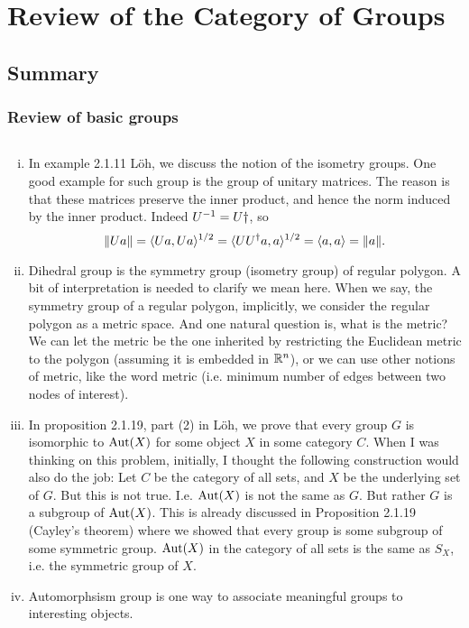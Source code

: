 \chapter{Review of the Category of Groups}


\section{Summary}
\subsection{Review of basic groups}
\begin{summary}
	$  $\\
	\begin{enumerate}[(i)]
		\item In example 2.1.11 L\"{o}h, we discuss the notion of the isometry groups. One good example for such group is the group of unitary matrices. The reason is that these matrices preserve the inner product, and hence the norm induced by the inner product. Indeed $ U^{-1} = U\dagger $, so
		\[ \norm{U a} = \langle Ua, Ua \rangle^{1/2} = \langle UU^\dagger a, a\rangle^{1/2} = \langle a,a \rangle =  \norm{a}. \]
		
		
		\item Dihedral group is the symmetry group (isometry group) of regular polygon. A bit of interpretation is needed to clarify we mean here. When we say, the symmetry group of a regular polygon, implicitly, we consider the regular polygon as a metric space. And one natural question is, what is the metric? We can let the metric be the one inherited by restricting the Euclidean metric to the polygon (assuming it is embedded in $ \mathbb{R}^n $), or we can use other notions of metric, like the word metric (i.e. minimum number of edges between two nodes of interest). 
		
		
		\item In proposition 2.1.19, part (2) in L\"{o}h, we prove that every group $ G $ is isomorphic to $ \operatorname{Aut}(X) $ for some object $ X $ in some category $ C $. When I was thinking on this problem, initially, I thought the following construction would also do the job: Let $ C $ be the category of all sets, and $ X $ be the underlying set of $ G $. But this is not true. I.e. $ \operatorname{Aut}(X) $ is not the same as $ G $. But rather $ G $ is a subgroup of $ \operatorname{Aut}(X) $. This is already discussed in Proposition 2.1.19 (Cayley's theorem) where we showed that every group is some subgroup of some symmetric group. $ \operatorname{Aut}(X) $ in the category of all sets is the same as $ S_X $, i.e. the symmetric group of $ X $.
		
		\item Automorphsism group is one way to associate meaningful groups to interesting objects.
		
		
	
	\end{enumerate}
\end{summary}

